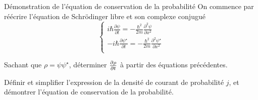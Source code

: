 \documentclass[12pt,fancy]{cours}
\begin{document}
\begin{exemple}{Démonstration de l'équation de conservation de la probabilité}
  On commence par réécrire l'équation de Schrödinger libre et son complexe conjugué
\begin{equation*}
\begin{cases}
i\hbar\frac{\partial\psi}{\partial t}=-\frac{\hbar^2}{2m}\frac{\partial^2\psi}{\partial x^2}\\[1mm]
-i\hbar\frac{\partial\psi^{\star}}{\partial t}=-\frac{\hbar^2}{2m}\frac{\partial^2\psi^{\star}}{\partial x^2}\\
\end{cases}
\end{equation*}
\begin{quest}
  \item	Sachant que $\rho=\psi\psi^{\star}$, déterminer $\frac{\partial{\rho}}{\partial{t}}$ à partir des équations précédentes.
  \item Définir et simplifier l'expression de la densité de courant de probabilité $j$, et démontrer l'équation de conservation de la probabilité.
\end{quest}

\end{exemple}
\end{document}
